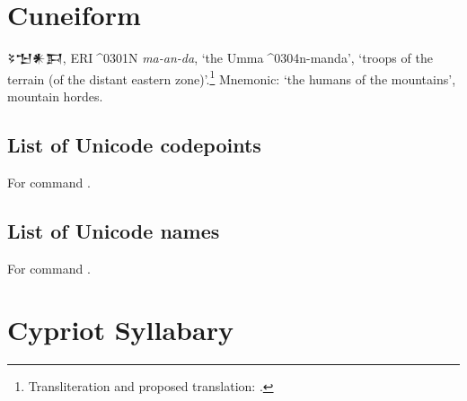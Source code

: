 \section{Cuneiform}

{\cufont 𒂟𒈠𒀭𒁕}, \textsc{ERI^^^^0301N} \textit{ma-an-da}, `the Umma^^^^0304n-manda', `troops of the terrain (of the distant eastern zone)'.\footnote{Transliteration and proposed translation: .} Mnemonic: `the humans of the mountains', mountain hordes. 



\subsection{List of Unicode codepoints}
For command \codedetok{\cutransuc{}}.
\begin{multicols}{4}\noindent
\cutag
\cushowplainlistuc
\eolist
\end{multicols}

\subsection{List of Unicode names}
For command \codedetok{\cutransun{}}.
\begin{multicols}{2}\noindent
\cutag
\cushowplainlistun
\eolist
\end{multicols}

%





\section{Cypriot Syllabary}


